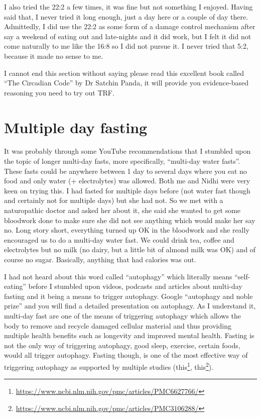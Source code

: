\documentclass[
  oneside]{book}
\DeclareRobustCommand{\href}[2]{#2\footnote{\url{#1}}}
\begin{document}
I also tried the 22:2 a few times, it was fine but not something I enjoyed. Having said that, I never tried it long enough, just a day here or a couple of day there. Admittedly, I did use the 22:2 as some form of a damage control mechanism after say a weekend of eating out and late-nights and it did work, but I felt it did not come naturally to me like the 16:8 so I did not pursue it. I never tried that 5:2, because it made no sense to me.

I cannot end this section without saying please read this excellent book called ``The Circadian Code'' by Dr Satchin Panda, it will provide you evidence-based reasoning you need to try out TRF.

\hypertarget{multiple-day-fasting}{%
\section{Multiple day fasting}\label{multiple-day-fasting}}

It was probably through some YouTube recommendations that I stumbled upon the topic of longer multi-day fasts, more specifically, ``multi-day water fasts''. These fasts could be anywhere between 1 day to several days where you eat no food and only water (+ electrolytes) was allowed. Both me and Nidhi were very keen on trying this. I had fasted for multiple days before (not water fast though and certainly not for multiple days) but she had not. So we met with a naturopathic doctor and asked her about it, she said she wanted to get some bloodwork done to make sure she did not see anything which would make her say no. Long story short, everything turned up OK in the bloodwork and she really encouraged us to do a multi-day water fast. We could drink tea, coffee and electrolytes but no milk (no dairy, but a little bit of almond milk was OK) and of course no sugar. Basically, anything that had calories was out.

I had not heard about this word called ``autophagy'' which literally means ``self-eating'' before I stumbled upon videos, podcasts and articles about multi-day fasting and it being a means to trigger autophagy. Google ``autophagy and noble prize'' and you will find a detailed presentation on autophagy. As I understand it, multi-day fast are one of the means of triggering autophagy which allows the body to remove and recycle damaged cellular material and thus providing multiple health benefits such as longevity and improved mental health. Fasting is not the only way of triggering autophagy, good sleep, exercise, certain foods, would all trigger autophagy. Fasting though, is one of the most effective way of triggering autophagy as supported by multiple studies (\href{https://www.ncbi.nlm.nih.gov/pmc/articles/PMC6627766/}{this}, \href{https://www.ncbi.nlm.nih.gov/pmc/articles/PMC3106288/}{this}).
\end{document}
